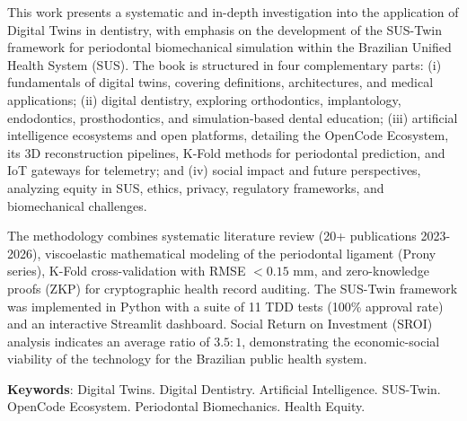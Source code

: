 \newpage
\begin{resumo}[Abstract]
\SingleSpacing

This work presents a systematic and in-depth investigation into the application of Digital Twins in dentistry, with emphasis on the development of the SUS-Twin framework for periodontal biomechanical simulation within the Brazilian Unified Health System (SUS). The book is structured in four complementary parts: (i) fundamentals of digital twins, covering definitions, architectures, and medical applications; (ii) digital dentistry, exploring orthodontics, implantology, endodontics, prosthodontics, and simulation-based dental education; (iii) artificial intelligence ecosystems and open platforms, detailing the OpenCode Ecosystem, its 3D reconstruction pipelines, K-Fold methods for periodontal prediction, and IoT gateways for telemetry; and (iv) social impact and future perspectives, analyzing equity in SUS, ethics, privacy, regulatory frameworks, and biomechanical challenges.

The methodology combines systematic literature review (20+ publications 2023-2026), viscoelastic mathematical modeling of the periodontal ligament (Prony series), K-Fold cross-validation with RMSE $< 0.15$ mm, and zero-knowledge proofs (ZKP) for cryptographic health record auditing. The SUS-Twin framework was implemented in Python with a suite of 11 TDD tests (100\% approval rate) and an interactive Streamlit dashboard. Social Return on Investment (SROI) analysis indicates an average ratio of $3.5:1$, demonstrating the economic-social viability of the technology for the Brazilian public health system.

\textbf{Keywords}: Digital Twins. Digital Dentistry. Artificial Intelligence. SUS-Twin. OpenCode Ecosystem. Periodontal Biomechanics. Health Equity.
\end{resumo}
